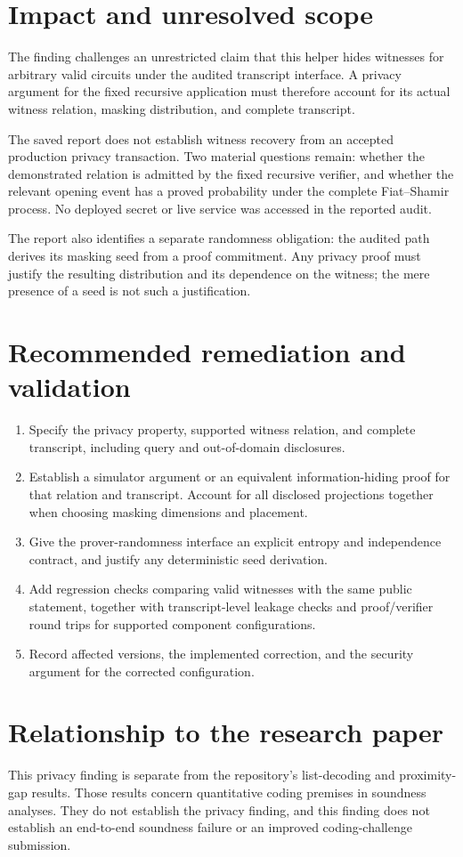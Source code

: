 \documentclass[11pt]{article}
\begin{document}
\section*{Impact and unresolved scope}

The finding challenges an unrestricted claim that this helper hides
witnesses for arbitrary valid circuits under the audited transcript
interface. A privacy argument for the fixed recursive application must
therefore account for its actual witness relation, masking distribution,
and complete transcript.

The saved report does not establish witness recovery from an accepted
production privacy transaction. Two material questions remain:
whether the demonstrated relation is admitted by the fixed recursive
verifier, and whether the relevant opening event has a proved probability
under the complete Fiat--Shamir process. No deployed secret or live
service was accessed in the reported audit.

The report also identifies a separate randomness obligation: the audited
path derives its masking seed from a proof commitment. Any privacy proof
must justify the resulting distribution and its dependence on the
witness; the mere presence of a seed is not such a justification.

\section*{Recommended remediation and validation}

\begin{enumerate}[leftmargin=*]
\item Specify the privacy property, supported witness relation, and
complete transcript, including query and out-of-domain disclosures.
\item Establish a simulator argument or an equivalent information-hiding
proof for that relation and transcript. Account for all disclosed
projections together when choosing masking dimensions and placement.
\item Give the prover-randomness interface an explicit entropy and
independence contract, and justify any deterministic seed derivation.
\item Add regression checks comparing valid witnesses with the same
public statement, together with transcript-level leakage checks and
proof/verifier round trips for supported component configurations.
\item Record affected versions, the implemented correction, and the
security argument for the corrected configuration.
\end{enumerate}

\section*{Relationship to the research paper}

This privacy finding is separate from the repository's list-decoding
and proximity-gap results. Those results concern quantitative coding
premises in soundness analyses. They do not establish the privacy
finding, and this finding does not establish an end-to-end soundness
failure or an improved coding-challenge submission.
\end{document}
